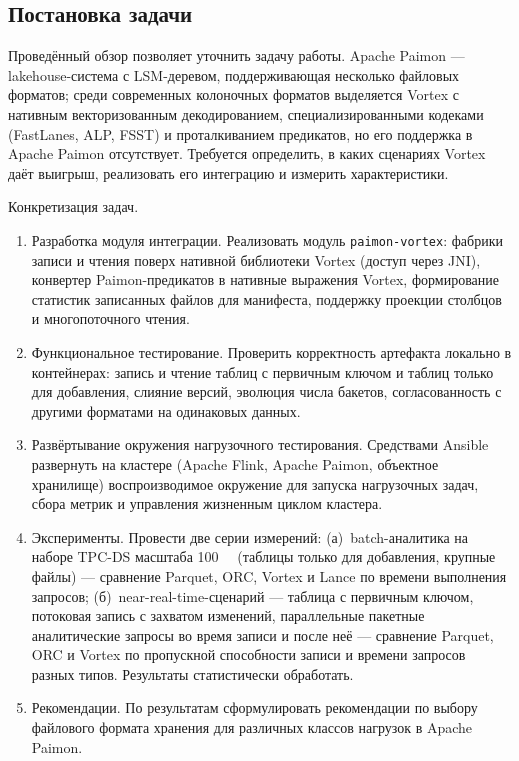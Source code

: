 \subsection{Постановка задачи}

Проведённый обзор позволяет уточнить задачу работы. Apache Paimon --- lakehouse-система
с LSM-деревом, поддерживающая несколько файловых форматов; среди современных
колоночных форматов выделяется Vortex с нативным векторизованным декодированием,
специализированными кодеками (FastLanes, ALP, FSST) и проталкиванием предикатов, но
его поддержка в Apache Paimon отсутствует. Требуется определить, в каких сценариях
Vortex даёт выигрыш, реализовать его интеграцию и измерить характеристики.

Конкретизация задач.

\begin{enumerate}
    \item Разработка модуля интеграции. Реализовать модуль
        \texttt{paimon-vortex}: фабрики записи и чтения поверх нативной библиотеки
        Vortex (доступ через JNI), конвертер Paimon-предикатов в нативные выражения
        Vortex, формирование статистик записанных файлов для манифеста, поддержку
        проекции столбцов и многопоточного чтения.
    \item Функциональное тестирование. Проверить корректность артефакта
        локально в контейнерах: запись и чтение таблиц с первичным ключом и таблиц
        только для добавления, слияние версий, эволюция числа бакетов, согласованность
        с другими форматами на одинаковых данных.
    \item Развёртывание окружения нагрузочного тестирования. Средствами
        Ansible развернуть на кластере (Apache Flink, Apache Paimon, объектное
        хранилище) воспроизводимое окружение для запуска нагрузочных задач, сбора
        метрик и управления жизненным циклом кластера.
    \item Эксперименты. Провести две серии измерений: (а)~batch-аналитика
        на наборе TPC-DS масштаба \SI{100}{\giga\byte} (таблицы только для добавления,
        крупные файлы) --- сравнение Parquet, ORC, Vortex и Lance по времени выполнения запросов;
        (б)~near-real-time-сценарий --- таблица с первичным ключом, потоковая запись
        с захватом изменений, параллельные пакетные аналитические запросы во время
        записи и после неё --- сравнение Parquet, ORC и Vortex по пропускной
        способности записи и времени запросов разных типов. Результаты статистически
        обработать.
    \item Рекомендации. По результатам сформулировать рекомендации по выбору
        файлового формата хранения для различных классов нагрузок в Apache Paimon.
\end{enumerate}


